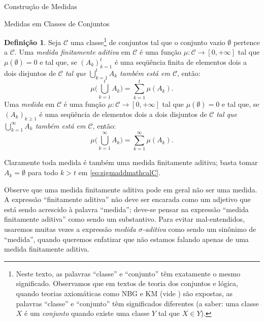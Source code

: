 \documentclass[oneside,final,11pt]{amsbook}
\theoremstyle{remark}\newtheorem{exercise}{Exercício}[chapter]
\theoremstyle{remark}\newtheorem{*exercise}[exercise]{\hbox to 0pt{\hskip 0pt minus 1fil*}Exercício}
\theoremstyle{definition}\newtheorem{exdefin}{Definição}[chapter]
\theoremstyle{plain}\newtheorem{teo}{Teorema}[section]
\theoremstyle{plain}\newtheorem{lem}[teo]{Lema}
\theoremstyle{plain}\newtheorem{prop}[teo]{Proposição}
\theoremstyle{plain}\newtheorem{cor}[teo]{Corolário}
\theoremstyle{definition}\newtheorem{defin}[teo]{Definição}
\theoremstyle{remark}\newtheorem{rem}[teo]{Observação}
\theoremstyle{definition}\newtheorem{notation}[teo]{Notação}
\theoremstyle{definition}\newtheorem{convention}[teo]{Convenção}
\theoremstyle{definition}\newtheorem{example}[teo]{Exemplo}
\numberwithin{section}{chapter}
\numberwithin{equation}{section}
\begin{document}
\begin{chapter}{Construção de Medidas}
\begin{section}{Medidas em Classes de Conjuntos}
\begin{defin}\label{thm:defmedidageral}
Seja $\mathcal C$ uma classe\footnote{%
Neste texto, as palavras ``classe'' e ``conjunto'' têm exatamente o mesmo significado. Observamos que em textos de teoria
dos conjuntos e lógica, quando teorias axiomáticas como NBG e KM (vide \cite{Mendelson})
são expostas, as palavras ``classe'' e ``conjunto'' têm significados diferentes (a saber: uma classe $X$ é um {\em conjunto\/}
quando existe uma classe $Y$ tal que $X\in Y$).} de conjuntos tal que o conjunto vazio $\emptyset$ pertence a $\mathcal C$.
Uma {\em medida finitamente aditiva\/}
em $\mathcal C$ é uma função $\mu:\mathcal C\to[0,+\infty]$ tal que $\mu(\emptyset)=0$ e tal que,
se $(A_k)_{k=1}^t$ é uma seqüência
finita de elementos dois a dois disjuntos de $\mathcal C$ {\em tal que $\bigcup_{k=1}^t A_k$ também está
em $\mathcal C$}, então:
\begin{equation}\label{eq:finitaddmathcalC}
\mu\Big(\bigcup_{k=1}^t A_k\Big)=\sum_{k=1}^t\mu(A_k).
\end{equation}
Uma {\em medida\/} em $\mathcal C$
é uma função $\mu:\mathcal C\to[0,+\infty]$ tal que $\mu(\emptyset)=0$ e tal que, se $(A_k)_{k\ge1}$ é
uma seqüência de elementos dois a dois disjuntos de $\mathcal C$ {\em tal que $\bigcup_{k=1}^\infty A_k$ também está
em $\mathcal C$}, então:
\begin{equation}\label{eq:sigmaddmathcalC}
\mu\Big(\bigcup_{k=1}^\infty A_k\Big)=\sum_{k=1}^\infty\mu(A_k).
\end{equation}
\end{defin}
Claramente toda medida é também uma medida finitamente aditiva; basta tomar $A_k=\emptyset$ para todo $k>t$
em \eqref{eq:sigmaddmathcalC}.

Observe que uma medida finitamente aditiva pode em geral não ser uma medida. A expressão ``finitamente aditiva''
não deve ser encarada como um adjetivo que está sendo acrescido à palavra ``medida''; deve-se pensar
na expressão ``medida finitamente aditiva'' como sendo um substantivo. Para evitar mal-entendidos, usaremos muitas vezes
a expressão {\em medida $\sigma$-aditiva\/}
como sendo um sinônimo de ``medida'', quando queremos enfatizar que não estamos falando apenas de uma medida
finitamente aditiva.


\end{section}
\end{chapter}
\end{document}
